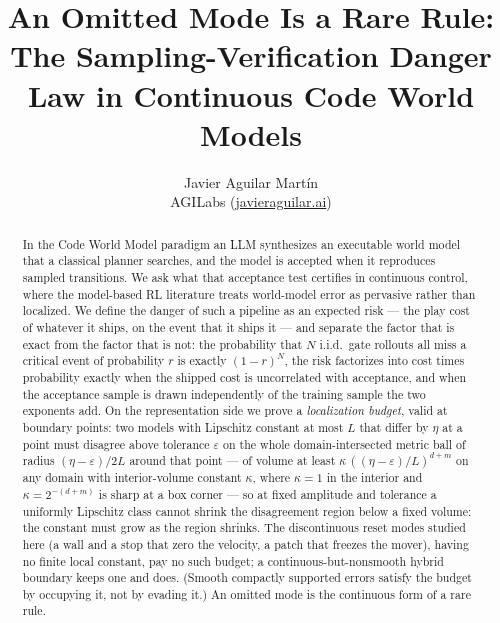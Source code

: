 \documentclass[11pt]{article}
\title{An Omitted Mode Is a Rare Rule: The Sampling-Verification Danger Law in Continuous Code World Models}
\author{Javier Aguilar Mart\'in\\ AGILabs (\href{https://javieraguilar.ai}{javieraguilar.ai})}
\date{}
\theoremstyle{definition}
\theoremstyle{remark}
\begin{document}
\maketitle

\begin{abstract}
In the Code World Model paradigm an LLM synthesizes an executable world model that a classical planner searches, and the model is accepted when it reproduces sampled transitions. We ask what that acceptance test certifies in continuous control, where the model-based RL literature treats world-model error as pervasive rather than localized. We define the danger of such a pipeline as an expected risk --- the play cost of whatever it ships, on the event that it ships it --- and separate the factor that is exact from the factor that is not: the probability that $N$ i.i.d.\ gate rollouts all miss a critical event of probability $r$ is exactly $(1-r)^N$, the risk factorizes into cost times probability exactly when the shipped cost is uncorrelated with acceptance, and when the acceptance sample is drawn independently of the training sample the two exponents add. On the representation side we prove a \emph{localization budget}, valid at boundary points: two models with Lipschitz constant at most $L$ that differ by $\eta$ at a point must disagree above tolerance $\varepsilon$ on the whole domain-intersected metric ball of radius $(\eta-\varepsilon)/2L$ around that point --- of volume at least $\kappa\,((\eta-\varepsilon)/L)^{d+m}$ on any domain with interior-volume constant $\kappa$, where $\kappa = 1$ in the interior and $\kappa = 2^{-(d+m)}$ is sharp at a box corner --- so at fixed amplitude and tolerance a uniformly Lipschitz class cannot shrink the disagreement region below a fixed volume: the constant must grow as the region shrinks. The discontinuous reset modes studied here (a wall and a stop that zero the velocity, a patch that freezes the mover), having no finite local constant, pay no such budget; a continuous-but-nonsmooth hybrid boundary keeps one and does. (Smooth compactly supported errors satisfy the budget by occupying it, not by evading it.) An omitted mode is the continuous form of a rare rule.


\end{abstract}
\end{document}
